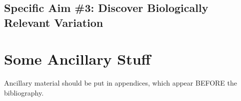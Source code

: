 \documentclass[11pt,proposal]{ucthesis}
\begin{document}
    


\section{Specific Aim \#3: Discover Biologically Relevant Variation}




\appendix
\chapter{Some Ancillary Stuff}

Ancillary material should be put in appendices, which appear BEFORE the
bibliography. 


\nocite{*}

\def\baselinestretch{1.0}\large\normalsize



\end{document}
